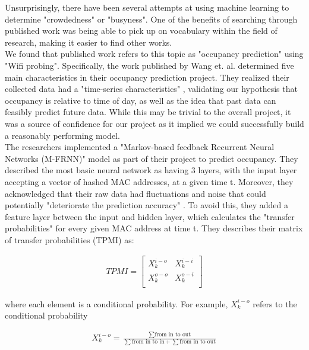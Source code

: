 \documentclass[journal, 12pt]{IEEEtran}
\begin{document}
\noindent Unsurprisingly, there have been several attempts at using machine learning to determine "crowdedness" or "busyness". One of the benefits of searching through published work was being able to pick up on vocabulary within the field of research, making it easier to find other works. \\

\noindent We found that published work refers to this topic as "occupancy prediction" using "Wifi probing"\cite{wang2018occupancy}. Specifically, the work published by Wang et. al. determined five main characteristics in their occupancy prediction project. They realized their collected data had a "time-series characteristics" \cite{wang2018occupancy}, validating our hypothesis that occupancy is relative to time of day, as well as the idea that past data can feasibly predict future data. While this may be trivial to the overall project, it was a source of confidence for our project as it implied we could successfully build a reasonably performing model. \\

\noindent The researchers implemented a "Markov-based feedback Recurrent Neural
Networks (M-FRNN)" \cite{wang2018occupancy} model as part of their project to predict occupancy. They described the most basic neural network as having 3 layers, with the input layer accepting a vector of hashed MAC addresses, at a given time t. Moreover, they acknowledged that their raw data had fluctuations and noise that could potentially "deteriorate the prediction accuracy" \cite{wang2018occupancy}. To avoid this, they added a feature layer between the input and hidden layer, which calculates the "transfer probabilities" for every given MAC address at time t\cite{wang2018occupancy}. They describes their matrix of transfer probabilities (TPMI) as: 

\begin{gather}
 TPMI
 =
  \begin{bmatrix}
   X_{k}^{i-o} & X_{k}^{i-i}\\
   X_{k}^{o-o} & X_{k}^{o-i}\\
   \end{bmatrix}
\end{gather}

\noindent where each element is a conditional probability. For example, $X_{k}^{i-o}$ refers to the conditional probability 

\begin{equation}
    \begin{split}
        X_{k}^{i-o} = \frac{\sum{\text{from in to out}}}{\sum{\text{from in to in}} + \sum{\text{from in to out}}}
    \end{split}
    \label{eq:}
\end{equation}
\end{document}
